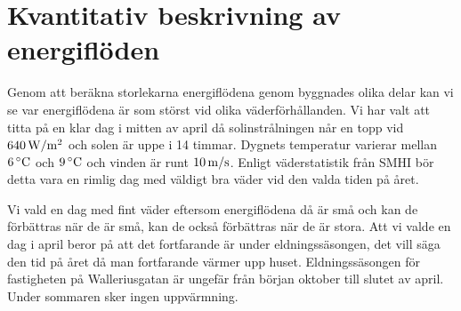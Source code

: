 \section{Kvantitativ beskrivning av energiflöden}

Genom att beräkna storlekarna energiflödena genom byggnades olika delar kan vi se var energiflödena är som störst vid olika väderförhållanden. Vi har valt att titta på en klar dag i mitten av april då solinstrålningen når en topp vid $\unit[640]{W/m^2}$ och solen är uppe i 14 timmar. Dygnets temperatur varierar mellan $\unit[6]{^\circ C}$ och $\unit[9]{^\circ C}$ och vinden är runt $\unit[10]{m/s}$. Enligt väderstatistik från SMHI bör detta vara en rimlig dag med väldigt bra väder vid den valda tiden på året.

Vi vald en dag med fint väder eftersom energiflödena då är små och kan de förbättras när de är små, kan de också förbättras när de är stora. Att vi valde en dag i april beror på att det fortfarande är under eldningssäsongen, det vill säga den tid på året då man fortfarande värmer upp huset. Eldningssäsongen för fastigheten på Walleriusgatan är ungefär från början oktober till slutet av april. Under sommaren sker ingen uppvärmning.








